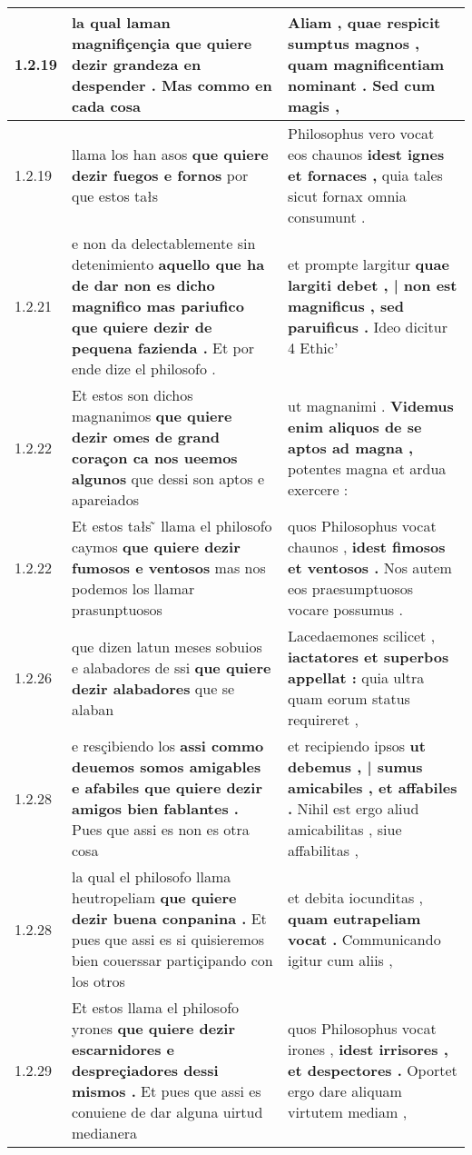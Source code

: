 \begin{tabular}{|p{1cm}|p{6.5cm}|p{6.5cm}|}
1.2.19 & la qual laman magnifiçençia \textbf{ que quiere dezir grandeza en despender . } Mas commo en cada cosa & Aliam , quae respicit sumptus magnos , \textbf{ quam magnificentiam nominant . } Sed cum magis , \\\hline
1.2.19 & llama los han asos \textbf{ que quiere dezir fuegos e fornos } por que estos tałs & Philosophus vero vocat eos chaunos \textbf{ idest ignes et fornaces , } quia tales sicut fornax omnia consumunt . \\\hline
1.2.21 & e non da delectablemente sin detenimiento \textbf{ aquello que ha de dar non es dicho magnifico mas pariufico que quiere dezir de pequena fazienda . } Et por ende dize el philosofo . & et prompte largitur \textbf{ quae largiti debet , | non est magnificus , sed paruificus . } Ideo dicitur 4 Ethic’ \\\hline
1.2.22 & Et estos son dichos magnanimos \textbf{ que quiere dezir omes de grand coraçon ca nos ueemos algunos } que dessi son aptos e apareiados & ut magnanimi . \textbf{ Videmus enim aliquos de se aptos ad magna , } potentes magna et ardua exercere : \\\hline
1.2.22 & Et estos tałs ̃ llama el philosofo caymos \textbf{ que quiere dezir fumosos e ventosos } mas nos podemos los llamar prasunptuosos & quos Philosophus vocat chaunos , \textbf{ idest fimosos et ventosos . } Nos autem eos praesumptuosos vocare possumus . \\\hline
1.2.26 & que dizen latun meses sobuios e alabadores de ssi \textbf{ que quiere dezir alabadores } que se alaban & Lacedaemones scilicet , \textbf{ iactatores et superbos appellat : } quia ultra quam eorum status requireret , \\\hline
1.2.28 & e resçibiendo los \textbf{ assi commo deuemos somos amigables e afabiles que quiere dezir amigos bien fablantes . } Pues que assi es non es otra cosa & et recipiendo ipsos \textbf{ ut debemus , | sumus amicabiles , et affabiles . } Nihil est ergo aliud amicabilitas , siue affabilitas , \\\hline
1.2.28 & la qual el philosofo llama heutropeliam \textbf{ que quiere dezir buena conpanina . } Et pues que assi es si quisieremos bien couerssar partiçipando con los otros & et debita iocunditas , \textbf{ quam eutrapeliam vocat . } Communicando igitur cum aliis , \\\hline
1.2.29 & Et estos llama el philosofo yrones \textbf{ que quiere dezir escarnidores e despreçiadores dessi mismos . } Et pues que assi es conuiene de dar alguna uirtud medianera & quos Philosophus vocat irones , \textbf{ idest irrisores , et despectores . } Oportet ergo dare aliquam virtutem mediam , \\\hline

\end{tabular}
